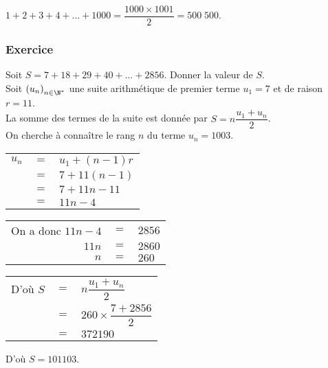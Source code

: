 $1 + 2 + 3 + 4 + ... + 1000 = \dfrac{1000 \times 1001}{2} = 500\; 500$.

\subsubsection{Exercice }

Soit $S = 7 + 18 + 29 + 40 + ... + 2856$. Donner la valeur de $S$. \\

Soit $\left(u_n\right)_{n \in \N^*}$ une suite arithmétique de premier terme $u_1 = 7$ et de raison $r = 11$. \\

La somme des termes de la suite est donnée par $S = n\dfrac{u_1+u_n}{2}$. \\

On cherche à connaître le rang $n$ du terme $u_n = 1003$. \\

\begin{tabular}{lll}
$u_n$ & $=$ & $ u_1 + \left(n-1\right)r$ \\
& $=$ & $7 + 11\left(n-1\right)$ \\
& $=$ & $7 + 11n - 11$ \\
& $=$ & $11n - 4$ \\
\end{tabular}

\vspace*{.3cm}

\begin{tabular}{rll}
On a donc $11n - 4$ & $=$ & $2856$ \\
$11n$ & $=$ &$2860$ \\
$n$ & $=$ & $260$ \\ 
\end{tabular}

\vspace*{.3cm}

\begin{tabular}{lll}
D'où $S$ & $=$ & $n\dfrac{u_1+u_n}{2}$ \vspace*{.3cm} \\
& $=$ & $260 \times \dfrac{7 + 2856}{2}$ \vspace*{.3cm} \\
& $=$ & $372 190$ \\
\end{tabular}

\vspace*{.3cm}

D'où $S = 101 103$.

